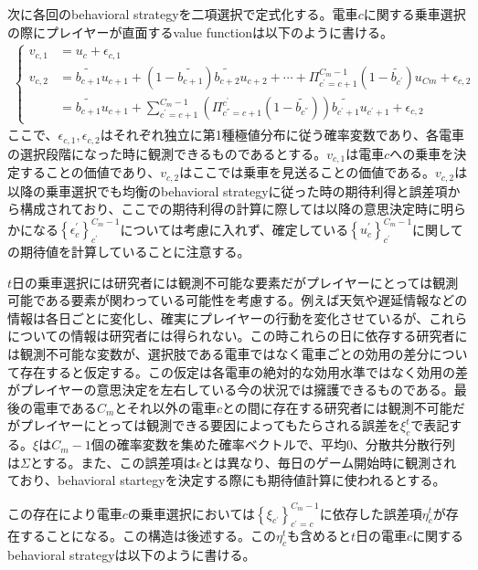 \documentclass{jsarticle}
\begin{document}
次に各回のbehavioral strategyを二項選択で定式化する。電車$c$に関する乗車選択の際にプレイヤーが直面するvalue functionは以下のように書ける。
\begin{align*}
	\begin{cases}
	v_{c, 1} &= u_c + \epsilon_{c, 1}\\[8pt]
	v_{c, 2} &= \tilde{b_{c+1}} u_{c+1} + (1 - \tilde{b_{c+1}}) \tilde{b_{c+2}} u_{c+2} + \cdots + \Pi_{c^{'} = c+1}^{C_m-1}(1 - \tilde{b_{c^{'}}}) u_{Cm} + \epsilon_{c, 2}\\[8pt]
	&= \tilde{b_{c+1}} u_{c+1} + \sum_{c^{'}=c+1}^{C_m-1} \left( \Pi_{c^{''} = c+1}^{c^{'}} (1 - \tilde{b_{c^{''}}}) \right) \tilde{b_{c^{'} + 1}} u_{c^{'} + 1} + \epsilon_{c, 2}
	\end{cases}
\end{align*}
ここで、$\epsilon_{c, 1}, \epsilon_{c, 2}$はそれぞれ独立に第1種極値分布に従う確率変数であり、各電車の選択段階になった時に観測できるものであるとする。$v_{c, 1}$は電車$c$への乗車を決定することの価値であり、$v_{c, 2}$はここでは乗車を見送ることの価値である。$v_{c, 2}$は以降の乗車選択でも均衡のbehavioral strategyに従った時の期待利得と誤差項から構成されており、ここでの期待利得の計算に際しては以降の意思決定時に明らかになる$\left\{ \epsilon_c^{'} \right\}_{c^{'}}^{C_m-1}$については考慮に入れず、確定している$\left\{ u_c^{'} \right\}_{c^{'}}^{C_m-1}$に関しての期待値を計算していることに注意する。

$t$日の乗車選択には研究者には観測不可能な要素だがプレイヤーにとっては観測可能である要素が関わっている可能性を考慮する。例えば天気や遅延情報などの情報は各日ごとに変化し、確実にプレイヤーの行動を変化させているが、これらについての情報は研究者には得られない。この時これらの日に依存する研究者には観測不可能な変数が、選択肢である電車ではなく電車ごとの効用の差分について存在すると仮定する。この仮定は各電車の絶対的な効用水準ではなく効用の差がプレイヤーの意思決定を左右している今の状況では擁護できるものである。最後の電車である$C_m$とそれ以外の電車$c$との間に存在する研究者には観測不可能だがプレイヤーにとっては観測できる要因によってもたらされる誤差を$\xi_c^t$で表記する。$\xi$は$C_m-1$個の確率変数を集めた確率ベクトルで、平均0、分散共分散行列は$\Sigma$とする。また、この誤差項は$\epsilon$とは異なり、毎日のゲーム開始時に観測されており、behavioral startegyを決定する際にも期待値計算に使われるとする。

この存在により電車$c$の乗車選択においては$\left\{ \xi_{c^{'}} \right\}_{c^{'} = c}^{C_m-1}$に依存した誤差項$\eta_c^t$が存在することになる。この構造は後述する。この$\eta_c^t$も含めると$t$日の電車$c$に関するbehavioral strategyは以下のように書ける。
\end{document}

